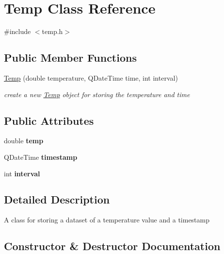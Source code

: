 \hypertarget{class_temp}{}\section{Temp Class Reference}
\label{class_temp}


{\ttfamily \#include $<$temp.\+h$>$}

\subsection*{Public Member Functions}
\begin{DoxyCompactItemize}
\item 
\hyperlink{class_temp_a2010f3312b77f0ff5853b60fefe016f4}{Temp} (double temperature, Q\+Date\+Time time, int interval)
\begin{DoxyCompactList}\small\item\em create a new \hyperlink{class_temp}{Temp} object for storing the temperature and time \end{DoxyCompactList}\end{DoxyCompactItemize}
\subsection*{Public Attributes}
\begin{DoxyCompactItemize}
\item 
double {\bfseries temp}\hypertarget{class_temp_a599fd6c9646291de791fde0b8b2553e6}{}\label{class_temp_a599fd6c9646291de791fde0b8b2553e6}

\item 
Q\+Date\+Time {\bfseries timestamp}\hypertarget{class_temp_af7e6ec5c6aac775b855491ff26531de3}{}\label{class_temp_af7e6ec5c6aac775b855491ff26531de3}

\item 
int {\bfseries interval}\hypertarget{class_temp_a01725bdf952fc8aeb9e3ec4238ef4e8c}{}\label{class_temp_a01725bdf952fc8aeb9e3ec4238ef4e8c}

\end{DoxyCompactItemize}


\subsection{Detailed Description}
A class for storing a dataset of a temperature value and a timestamp 

\subsection{Constructor \& Destructor Documentation}
